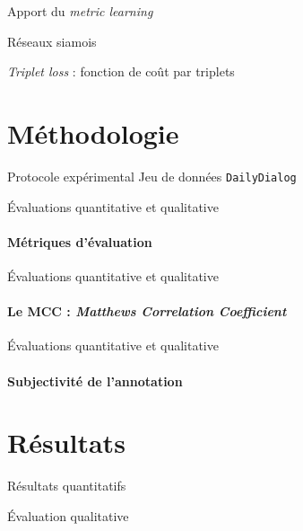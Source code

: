 \documentclass[11pt,aspectratio=169]{beamer}
\begin{document}
\begin{frame}{Apport du \textsl{metric learning}}

\end{frame}

\begin{frame}{Réseaux siamois}
    
\end{frame}

\begin{frame}{\textsl{Triplet loss} : fonction de coût par triplets}
    
\end{frame}

\section{Méthodologie}

\begin{frame}{Protocole expérimental}
    Jeu de données \texttt{DailyDialog}~
\end{frame}

\begin{frame}{Évaluations quantitative et qualitative}
    \framesubtitle{Métriques d'évaluation}
    
\end{frame}

\begin{frame}{Évaluations quantitative et qualitative}
    \framesubtitle{Le MCC : \textsl{Matthews Correlation Coefficient}}
    
\end{frame}

\begin{frame}{Évaluations quantitative et qualitative}
    \framesubtitle{Subjectivité de l'annotation}
    
\end{frame}

\section{Résultats}

\begin{frame}{Résultats quantitatifs}
    
\end{frame}

\begin{frame}{Évaluation qualitative}
    
\end{frame}
\end{document}
